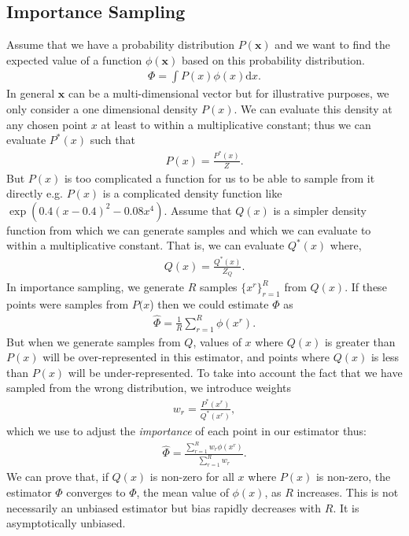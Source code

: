 \documentclass[10pt ]{article}
\begin{document}
\subsection{Importance Sampling}
Assume that we have a probability distribution $P(\mathbf{x})$ and we want to find the expected value of a function $\phi(\mathbf{x})$ based on this probability distribution.
\begin{align}
\Phi = \int P(x) \phi(x) \mathrm{d}x.
\label{eq_importance_sampling_E}
\end{align}
In general $\mathbf{x}$ can be a multi-dimensional vector but for illustrative purposes, we only consider a one dimensional density $P(x)$. We can evaluate this density at any chosen point $x$ at least to within a multiplicative constant; thus we can evaluate $P^*(x)$ such that 
\begin{align}
P(x) = \frac{P^*(x)}{Z}.
\label{eq_importance_sampling}
\end{align}
But $P(x)$ is too complicated a function for us to be able to sample from it directly e.g. $P(x)$ is a complicated density function like $\exp(0.4(x-0.4)^2-0.08x^4)$. Assume that $Q(x)$ is a simpler density function from which we can generate samples and which we can evaluate to within a multiplicative constant. That is, we can evaluate $Q^*(x)$ where, 
\begin{align}
Q(x) = \frac{Q^*(x)}{Z_Q}.
\label{eq_importance_sampling_Q}
\end{align}
In importance sampling, we generate $R$ samples $\{ x^r \}_{r=1}^R$ from $Q(x)$. If these points were samples from $P(x$) then we could estimate $\Phi$ as
\begin{align}
\hat{\Phi} = \frac{1}{R} \sum_{r=1}^R \phi(x^r).
\label{eq_importance_sampling_original_px}
\end{align}
 But when we generate samples from $Q$, values of $x$ where  $Q(x)$ is greater than $P(x)$ will be over-represented in this estimator, and points where $Q(x)$ is less than $P(x)$ will be under-represented. To take into account the fact that we have sampled from the wrong distribution, we introduce weights
\begin{align}
w_r = \frac{P^*(x^r)}{Q^*(x^r)},
\label{eq_importance_sampling_weights}
\end{align} 
which we use to adjust the {\em importance} of each point in our estimator thus:
 \begin{align}
\hat{\Phi} =  \frac{\sum_{r=1}^R w_r\phi(x^r)}{\sum_{r=1}^R w_r}.
\label{eq_importance_sampling_weights_applied}
\end{align}
We can prove that, if $Q(x)$ is non-zero for all $x$ where $P(x)$ is non-zero, the estimator $\hat{\Phi}$ converges to $\Phi$, the mean value of $\phi(x)$, as $R$ increases.  This is not necessarily an unbiased estimator but bias rapidly decreases with $R$. It is asymptotically unbiased.
\end{document}
